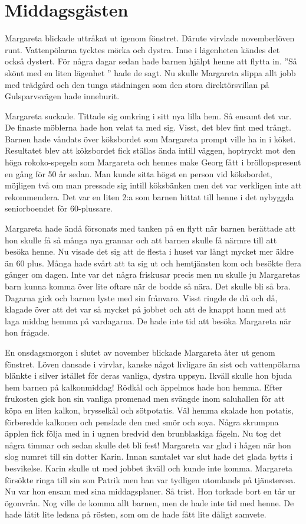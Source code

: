 \chapter[middagsgästen]{Middagsgästen}

Margareta blickade uttråkat ut igenom fönstret. Därute virvlade novemberlöven runt. Vattenpölarna tycktes mörka och dystra. Inne i lägenheten kändes det också dystert. För några dagar sedan hade barnen hjälpt henne att flytta in. ”Så skönt med en liten lägenhet ” hade de sagt. Nu skulle Margareta slippa allt jobb med trädgård och den tunga städningen som den stora direktörsvillan på Gulsparvsvägen hade inneburit.

Margareta suckade. Tittade sig omkring i sitt nya lilla hem. Så ensamt det var. De finaste möblerna hade hon velat ta med sig. Visst, det blev fint med trångt. Barnen hade våndats över köksbordet som Margareta prompt ville ha in i köket. Resultatet blev att köksbordet fick ställas ända intill väggen, hoptryckt mot den höga rokoko-spegeln som Margareta och hennes make Georg fått i bröllopspresent en gång för 50 år sedan. Man kunde sitta högst en person vid köksbordet, möjligen två om man pressade sig intill köksbänken men det var verkligen inte att rekommendera. Det var en liten 2:a som barnen hittat till henne i det nybyggda seniorboendet för 60-plussare. 

Margareta hade ändå försonats med tanken på en flytt när barnen berättade att hon skulle få så många nya grannar och att barnen skulle få närmre till att besöka henne. Nu visade det sig att de flesta i huset var långt mycket mer äldre än 60 plus. Många hade svårt att ta sig ut och hemtjänsten kom och besökte flera gånger om dagen. Inte var det några friskusar precis men nu skulle ju Margaretas barn kunna komma över lite oftare när de bodde så nära. Det skulle bli så bra. Dagarna gick och barnen lyste med sin frånvaro. Visst ringde de då och då, klagade över att det var så mycket på jobbet och att de knappt hann med att laga middag hemma på vardagarna. De hade inte tid att besöka Margareta när hon frågade.

En onsdagsmorgon i slutet av november blickade Margareta åter ut genom fönstret. Löven dansade i virvlar, kanske något livligare än sist och vattenpölarna blänkte i silver istället för deras vanliga, dystra uppsyn. Ikväll skulle hon bjuda hem barnen på kalkonmiddag! Rödkål och äppelmos hade hon hemma. Efter frukosten gick hon sin vanliga promenad men svängde inom saluhallen för att köpa en liten kalkon, brysselkål och sötpotatis. Väl hemma skalade hon potatis, förberedde kalkonen och penslade den med smör och soya. Några skrumpna äpplen fick följa med in i ugnen bredvid den brunblaskiga fågeln. Nu tog det några timmar och sedan skulle det bli fest! Margareta var glad i hågen när hon slog numret till sin dotter Karin. Innan samtalet var slut hade det glada bytts i besvikelse. Karin skulle ut med jobbet ikväll och kunde inte komma. Margareta försökte ringa till sin son Patrik men han var tydligen utomlands på tjänsteresa. Nu var hon ensam med sina middagsplaner. Så trist. Hon torkade bort en tår ur ögonvrån. Nog ville de komma allt barnen, men de hade inte tid med henne. De hade låtit lite ledsna på rösten, som om de hade fått lite dåligt samvete. 

